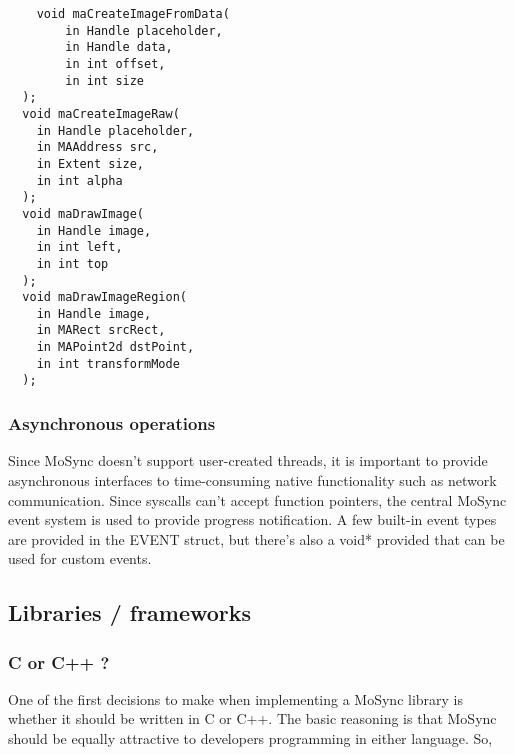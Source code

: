 \documentclass {article}
\begin{document}
\begin{verbatim}
	void maCreateImageFromData(
		in Handle placeholder, 
		in Handle data, 
		in int offset, 
		in int size
  );
  void maCreateImageRaw(
  	in Handle placeholder, 
  	in MAAddress src, 
  	in Extent size, 
  	in int alpha
  );
  void maDrawImage(
  	in Handle image, 
  	in int left, 
  	in int top
  );
  void maDrawImageRegion(
  	in Handle image, 
  	in MARect srcRect, 
  	in MAPoint2d dstPoint,
  	in int transformMode
  );
\end{verbatim}


\subsubsection{Asynchronous operations}

Since MoSync doesn't support user-created threads, it is important to provide asynchronous interfaces to time-consuming native functionality such as network communication. Since syscalls can't accept function pointers, the central MoSync event system is used to provide progress notification. A few built-in event types are provided in the EVENT struct, but there's also a void* provided that can be used for custom events.

\subsection{Libraries / frameworks}

\subsubsection{C or C++ ?}
One of the first decisions to make when implementing a MoSync library is whether it should be written in C or C++. The basic reasoning is that MoSync should be equally attractive to developers programming in either language. So, 
\end{document}
